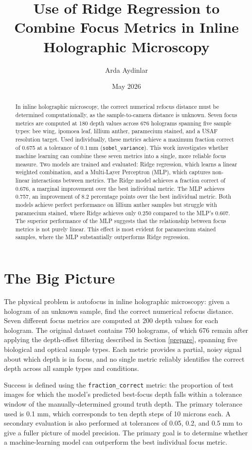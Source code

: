 \documentclass{article}
\title{Use of Ridge Regression to Combine Focus Metrics in Inline Holographic Microscopy}
\author{Arda Aydinlar}
\date{May 2026}
\begin{document}
\maketitle

\begin{abstract}
In inline holographic microscopy, the correct numerical refocus distance must be determined computationally, as the sample-to-camera distance is unknown. Seven focus metrics are computed at 180 depth values across 676 holograms spanning five sample types: bee wing, ipomoea leaf, lillium anther, paramecium stained, and a USAF resolution target. Used individually, these metrics achieve a maximum fraction correct of 0.675 at a tolerance of 0.1\,mm (\texttt{sobel\_variance}). This work investigates whether machine learning can combine these seven metrics into a single, more reliable focus measure. Two models are trained and evaluated: Ridge regression, which learns a linear weighted combination, and a Multi-Layer Perceptron (MLP), which captures non-linear interactions between metrics. The Ridge model achieves a fraction correct of 0.676, a marginal improvement over the best individual metric. The MLP achieves 0.757, an improvement of 8.2 percentage points over the best individual metric. Both models achieve perfect performance on lillium anther samples but struggle with paramecium stained, where Ridge achieves only 0.250 compared to the MLP's 0.607. The superior performance of the MLP suggests that the relationship between focus metrics is not purely linear. This effect is most evident for paramecium stained samples, where the MLP substantially outperforms Ridge regression.
\end{abstract}

\section{The Big Picture}
The physical problem is autofocus in inline holographic microscopy: given a hologram of an unknown sample, find the correct numerical refocus distance. Seven different focus metrics are computed at 200 depth values for each hologram. The original dataset contains 750 holograms, of which 676 remain after applying the depth-offset filtering described in Section \ref{prepare}, spanning five biological and optical sample types. Each metric provides a partial, noisy signal about which depth is in focus, and no single metric reliably identifies the correct depth across all sample types and conditions.

Success is defined using the \texttt{fraction\_correct} metric: the proportion of test images for which the model's predicted best-focus depth falls within a tolerance window of the manually-determined ground truth depth. The primary tolerance used is 0.1 mm, which corresponds to ten depth steps of 10 microns each. A secondary evaluation is also performed at tolerances of 0.05, 0.2, and 0.5 mm to give a fuller picture of model precision. The primary goal is to determine whether a machine-learning model can outperform the best individual focus metric.
\end{document}
